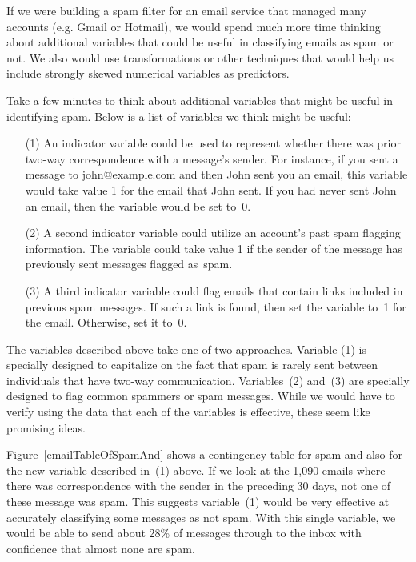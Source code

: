 If we were building a spam filter for an email service that managed many accounts (e.g. Gmail or Hotmail), we would spend much more time thinking about additional variables that could be useful in classifying emails as spam or not. We also would use transformations or other techniques that would help us include strongly skewed numerical variables as predictors.

Take a few minutes to think about additional variables that might be useful in identifying spam. Below is a list of variables we think might be useful:
\begin{enumerate}
\item[(1)] An indicator variable could be used to represent whether there was prior two-way correspondence with a message's sender. For instance, if you sent a message to john@example.com and then John sent you an email, this variable would take value 1 for the email that John sent. If you had never sent John an email, then the variable would be set to~0.
\item[(2)] A second indicator variable could utilize an account's past spam flagging information. The variable could take value 1 if the sender of the message has previously sent messages flagged as~spam.
\item[(3)] A third indicator variable could flag emails that contain links included in previous spam messages. If such a link is found, then set the variable to~1 for the email. Otherwise, set it to~0.
\end{enumerate}
The variables described above take one of two approaches. Variable (1) is specially designed to capitalize on the fact that spam is rarely sent between individuals that have two-way communication. Variables~(2) and~(3) are specially designed to flag common spammers or spam messages. While we would have to verify using the data that each of the variables is effective, these seem like promising ideas.

Figure~\ref{emailTableOfSpamAnd} shows a contingency table for spam and also for the new variable described in~(1) above. If we look at the 1,090 emails where there was correspondence with the sender in the preceding 30 days, not one of these message was spam. This suggests variable~(1) would be very effective at accurately classifying some messages as not spam. With this single variable, we would be able to send about 28\% of messages through to the inbox with confidence that almost none are spam.

